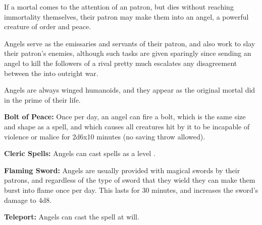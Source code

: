 \begin{multicols*}{2}
If a mortal comes to the attention of an  patron, but dies without reaching immortality themselves, their patron may make them into an angel, a powerful creature of order and peace.

Angels serve as the emissaries and servants of their patron, and also work to slay their patron’s enemies, although such tasks are given sparingly since sending an angel to kill the followers of a rival  pretty much escalates any disagreement between the  into outright war.

Angels are always winged humanoids, and they appear as the original mortal did in the prime of their life.

\textbf{Bolt of Peace:} Once per day, an angel can fire a bolt, which is the same size and shape as a  spell, and which causes all creatures hit by it to be incapable of violence or malice for 2d6x10 minutes (no saving throw allowed).

\textbf{Cleric Spells:} Angels can cast spells as a  level .

\textbf{Flaming Sword:} Angels are usually provided with magical swords by their patrons, and regardless of the type of sword that they wield they can make them burst into flame once per day. This lasts for 30 minutes, and increases the sword’s damage to 4d8.

\textbf{Teleport:} Angels can cast the  spell at will.


\end{multicols*}
